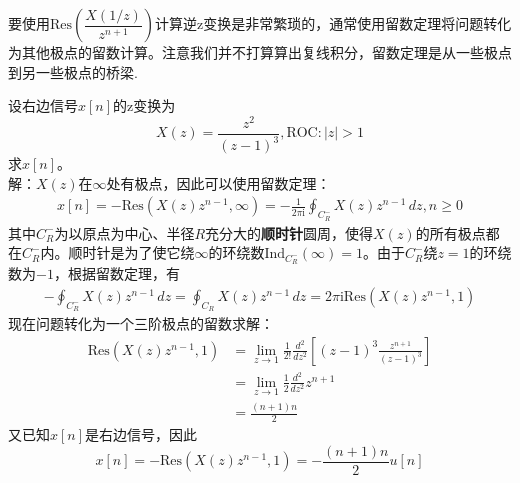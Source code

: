 要使用$\mathrm{Res}\left(\dfrac{X(1/z)}{z^{n+1}}\right)$计算逆z变换是非常繁琐的，通常使用留数定理将问题转化为其他极点的留数计算。注意我们并不打算算出复线积分，留数定理是从一些极点到另一些极点的桥梁.
\begin{example}
    设右边信号$x[n]$的z变换为
    \[X(z)=\frac{z^2}{(z-1)^3},\mathrm{ROC}:|z|>1\]
    求$x[n]$。\\
    解：$X(z)$在$\infty$处有极点，因此可以使用留数定理：
    \begin{align*}
        x[n]=-\mathrm{Res}\left(X(z)z^{n-1},\infty\right)=-\frac{1}{2\pi \mathrm{i}}\oint_{C^-_R}X(z)z^{n-1}\,dz,n\ge 0
    \end{align*}
    其中$C^-_R$为以原点为中心、半径$R$充分大的\textbf{顺时针}圆周，使得$X(z)$的所有极点都在$C^-_R$内。顺时针是为了使它绕$\infty$的环绕数$\mathrm{Ind}_{C^-_R}(\infty)=1$。由于$C^-_R$绕$z=1$的环绕数为$-1$，根据留数定理，有
    \begin{align*}
        -\oint_{C^-_R}X(z)z^{n-1}\,dz=\oint_{C_R}X(z)z^{n-1}\,dz=2\pi \mathrm{i} \mathrm{Res}\left(X(z)z^{n-1},1\right)
    \end{align*}
    现在问题转化为一个三阶极点的留数求解：
    \begin{align*}
        \mathrm{Res}\left(X(z)z^{n-1},1\right)&=\lim_{z\to 1}\frac{1}{2!}\frac{d^2}{dz^2}\left[(z-1)^3\frac{z^{n+1}}{(z-1)^3}\right]\\
        &=\lim_{z\to 1}\frac{1}{2}\frac{d^2}{dz^2}z^{n+1}\\
        &=\frac{(n+1)n}{2}
    \end{align*}
    又已知$x[n]$是右边信号，因此
    $$x[n]=-\mathrm{Res}\left(X(z)z^{n-1},1\right)=-\frac{(n+1)n}{2}u[n]$$    
\end{example}

